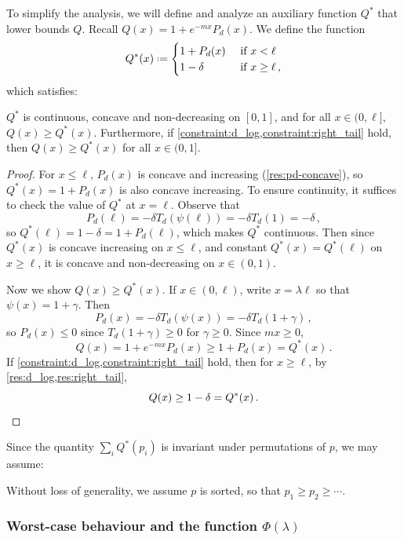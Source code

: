 \documentclass{theoretics}
\newcommand*{\define}{\mathrel{\vcenter{\baselineskip0.5ex \lineskiplimit0pt
                      \hbox{\scriptsize.}\hbox{\scriptsize.}}}%
                      =}
\begin{document}
To simplify the analysis, we will define and analyze an auxiliary function $Q^*$ that lower bounds
$Q$.
Recall $Q(x) = 1 + e^{-mx} P_d(x)$.  We define the function
\[
  Q^*(x) \define \begin{cases}
    1 + P_d(x) &\text{ if } x < \ell \\
    1 - \delta &\text{ if } x \geq \ell \,,
  \end{cases}
\]
which satisfies:
\begin{proposition}[Properties of $Q^*$]
\label{res:Q*-properties}
$Q^*$ is continuous, concave and non-decreasing on $[0,1]$, and for all $x \in (0,\ell]$, $Q(x) \geq
Q^*(x)$.  Furthermore, if \cref{constraint:d_log,constraint:right_tail} hold, then $Q(x) \geq
Q^*(x)$ for all $x \in (0,1]$.
\end{proposition}
\begin{proof}
For $x \leq \ell$, $P_d(x)$ is concave and increasing
(\cref{res:pd-concave}), so $Q^*(x) = 1 + P_d(x)$ is also concave increasing. To ensure continuity,
it suffices to check the value of $Q^*$ at $x=\ell$. Observe that
\[
P_d(\ell) = - \delta T_d(\psi(\ell)) = - \delta T_d(1) = - \delta \,,
\]
so $Q^*(\ell) = 1-\delta =
1 + P_d(\ell)$, which makes $Q^*$ continuous. Then since $Q^*(x)$ is concave increasing on $x \leq
\ell$, and constant $Q^*(x) = Q^*(\ell)$ on $x \geq \ell$, it is concave and non-decreasing on $x
\in (0,1)$.

Now we show $Q(x) \geq Q^*(x)$. If $x \in (0, \ell)$, write $x = \lambda \ell$ so that $\psi(x) = 1
+ \gamma$. Then
\[
  P_d(x) = - \delta T_d(\psi(x)) = -\delta T_d(1 + \gamma) \,,
\]
so $P_d(x) \leq 0$ since $T_d(1+\gamma) \geq 0$ for $\gamma \geq 0$. Since $mx \geq 0$,
\[
  Q(x) = 1 + e^{-mx} P_d(x) \geq 1 + P_d(x) = Q^*(x) \,.
\]
If \cref{constraint:d_log,constraint:right_tail} hold, then for $x \geq \ell$, by
\cref{res:d_log,res:right_tail},
\[
  Q(x) \geq 1 - \delta = Q^*(x) \,. \qedhere
\]
\end{proof}

Since the quantity $\sum_i Q^*(p_i)$ is invariant under permutations of $p$, we may assume:
\begin{assumption}
\label{assumption:sorted}
Without loss of generality, we assume $p$ is sorted, so that $p_1 \geq p_2 \geq \dotsm$.
\end{assumption}


\subsubsection{Worst-case behaviour and the function \texorpdfstring{$\Phi(\lambda)$}{Phi(lambda)}}
\label{section:better-bound-worst-case}
\end{document}
